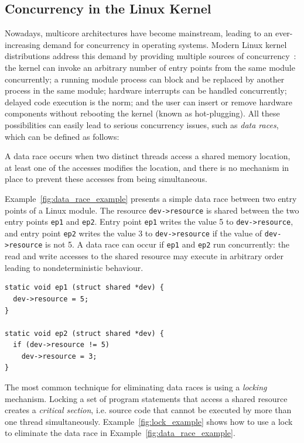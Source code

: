 \subsection{Concurrency in the Linux Kernel}
\label{bg:concurrency}

Nowadays, multicore architectures have become mainstream, leading to an ever-increasing demand for concurrency in operating systems. Modern Linux kernel distributions address this demand by providing multiple sources of concurrency~\cite{corbet2005linux}: the kernel can invoke an arbitrary number of entry points from the same module concurrently; a running module process can block and be replaced by another process in the same module; hardware interrupts can be handled concurrently; delayed code execution is the norm; and the user can insert or remove hardware components without rebooting the kernel (known as hot-plugging). All these possibilities can easily lead to serious concurrency issues, such as \emph{data races}, which can be defined as follows:

\begin{definition}
\label{definition:datarace}
A data race occurs when two distinct threads access a shared memory location, at least one of the accesses modifies the location, and there is no mechanism in place to prevent these accesses from being simultaneous.
\end{definition}

Example~\ref{fig:data_race_example} presents a simple data race between two entry points of a Linux module. The resource \texttt{dev->resource} is shared between the two entry points \texttt{ep1} and \texttt{ep2}. Entry point \texttt{ep1} writes the value 5 to \texttt{dev->resource}, and entry point \texttt{ep2} writes the value 3 to \texttt{dev->resource} if the value of \texttt{dev->resource} is not 5. A data race can occur if \texttt{ep1} and \texttt{ep2} run concurrently: the read and write accesses to the shared resource may execute in arbitrary order leading to nondeterministic behaviour.

\begin{lstlisting}[caption = Simple data race in a Linux module, label = fig:data_race_example]
static void ep1 (struct shared *dev) {
  dev->resource = 5;
}

static void ep2 (struct shared *dev) {
  if (dev->resource != 5)
    dev->resource = 3;
}
\end{lstlisting}

The most common technique for eliminating data races is using a \emph{locking} mechanism. Locking a set of program statements that access a shared resource creates a \emph{critical section}, i.e. source code that cannot be executed by more than one thread simultaneously. Example~\ref{fig:lock_example} shows how to use a lock to eliminate the data race in Example~\ref{fig:data_race_example}.

